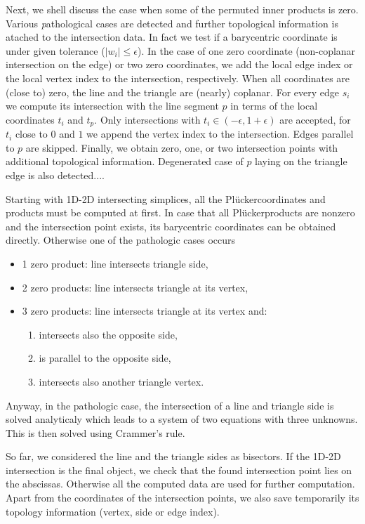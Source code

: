 \documentclass{elsarticle}
\def\abs#1{\left|#1\right|}
\def\abs#1{| #1 |}
\newcommand{\plucker}{Pl\"{u}cker}
\begin{document}
Next, we shell discuss the case when some of the permuted inner products is zero. Various {\emph pathological} cases are detected and further topological 
information is atached to the intersection data. In fact we test if a barycentric coordinate is under given tolerance 
($\abs{w_i} \le \epsilon$). In the case of one zero coordinate (non-coplanar intersection on the edge)
or two zero coordinates, we add the local edge index or the local vertex index to the intersection, respectively.
When all coordinates are (close to) zero, the line and the triangle are (nearly) coplanar. For every edge $s_i$ we compute
its intersection with the line segment $p$ in terms of the local coordinates $t_i$ and $t_p$. Only intersections with $t_i \in (-\epsilon, 1+\epsilon)$
are accepted, for $t_i$ close to $0$ and $1$ we append the vertex index to the intersection. Edges parallel to $p$ are skipped. 
Finally, we obtain zero, one, or two intersection points with additional topological information. Degenerated case of $p$ laying on the triangle edge is also detected....



Starting with 1D-2D intersecting simplices, all the \plucker coordinates and products must be computed at first.
In case that all \plucker products are nonzero and the intersection point exists, its barycentric coordinates 
can be obtained directly. Otherwise one of the pathologic cases occurs
%
\begin{itemize}[itemsep=-3pt]
\item 1 zero product: line intersects triangle side,
\item 2 zero products: line intersects triangle at its vertex,
\item 3 zero products: line intersects triangle at its vertex and:
  \begin{enumerate}[ itemsep=-3pt]
    \item intersects also the opposite side,
    \item is parallel to the opposite side,
    \item intersects also another triangle vertex.
  \end{enumerate}
\end{itemize}
%
Anyway, in the pathologic case, the intersection of a line and triangle side is solved analyticaly which leads
to a system of two equations with three unknowns. This is then solved using Crammer's rule.

So far, we considered the line and the triangle sides as bisectors. If the 1D-2D intersection is the final object,
we check that the found intersection point lies on the abscissas. Otherwise all the computed data are used for 
further computation. Apart from the coordinates of the intersection points, we also save temporarily its topology
information (vertex, side or edge index).
\end{document}
